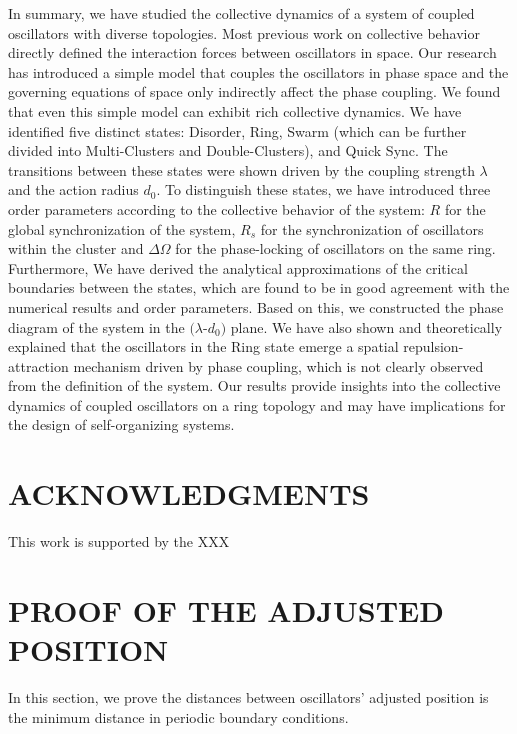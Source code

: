 \documentclass[%
 aip,
 amsmath,amssymb,
 reprint,%
]{revtex4-1}
\begin{document}
In summary, we have studied the collective dynamics of a system of coupled oscillators with diverse topologies. 
Most previous work on collective behavior directly defined the interaction forces between oscillators in space. Our research has introduced a simple model that couples the oscillators in phase space and the governing equations of space only indirectly affect the phase coupling. We found that even this simple model can exhibit rich collective dynamics.
We have identified five distinct states: Disorder, Ring, Swarm (which can be further divided into Multi-Clusters and Double-Clusters), and Quick Sync. 
The transitions between these states were shown driven by the coupling strength $\lambda$ and the action radius $d_0$. 
To distinguish these states, we have introduced three order parameters according to the collective behavior of the system: $R$ for the global synchronization of the system, $R_s$ for the synchronization of oscillators within the cluster and $\Delta\Omega$ for the phase-locking of oscillators on the same ring.
Furthermore, We have derived the analytical approximations of the critical boundaries between the states, which are found to be in good agreement with the numerical results and order parameters. Based on this, we constructed the phase diagram of the system in the $(\lambda$-$d_0)$ plane.
We have also shown and theoretically explained that the oscillators in the Ring state emerge a spatial repulsion-attraction mechanism driven by phase coupling, which is not clearly observed from the definition of the system.
Our results provide insights into the collective dynamics of coupled oscillators on a ring topology and may have implications for the design of self-organizing systems.

\section{ACKNOWLEDGMENTS}

This work is supported by the XXX

\appendix

\section{\label{sec:adj_pos} PROOF OF THE ADJUSTED POSITION}

In this section, we prove the distances between oscillators' adjusted position is the minimum distance in periodic boundary conditions. 
\end{document}
